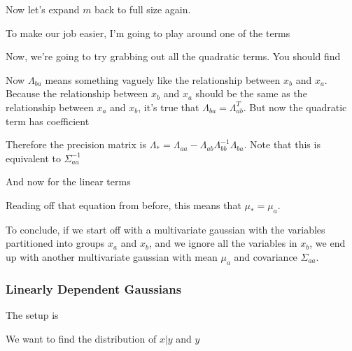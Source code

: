 \documentclass[12pt]{article}
\begin{document}
Now let's expand $m$ back to full size again.


To make our job easier, I'm going to play around one of the terms
 
Now, we're going to try grabbing out all the quadratic terms. You should find

Now $\Lambda_{ba}$ means something vaguely like the relationship between $x_b$ and $x_a$. Because the relationship between $x_b$ and $x_a$ should be the same as the relationship between $x_a$ and $x_b$, it's true that $\Lambda_{ba} = \Lambda_{ab}^T$. But now the quadratic term has coefficient

Therefore the precision matrix is $\Lambda_* = \Lambda_{aa} - \Lambda_{ab} \Lambda_{bb}^{-1} \Lambda_{ba}$. Note that this is equivalent to $\Sigma_{aa}^{-1}$

And now for the linear terms

Reading off that equation from before, this means that $\mu_* = \mu_a$.

To conclude, if we start off with a multivariate gaussian with the variables partitioned into groups $x_a$ and $x_b$, and we ignore all the variables in $x_b$, we end up with another multivariate gaussian with mean $\mu_a$ and covariance $\Sigma_{aa}$.

\subsubsection{Linearly Dependent Gaussians}

The setup is


We want to find the distribution of $x|y$ and $y$
\end{document}
